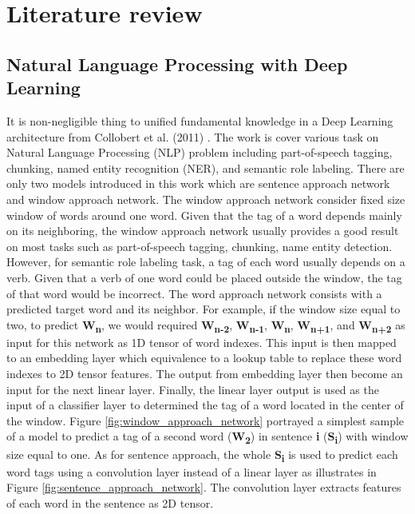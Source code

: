 \chapter{Literature review}

\section{Natural Language Processing with Deep Learning}
It is non-negligible thing to unified fundamental knowledge in a Deep Learning architecture from Collobert et al. (2011) \cite{DBLP:journals/corr/abs-1103-0398}.
The work is cover various task on Natural Language Processing (NLP) problem including part-of-speech tagging, chunking, named entity recognition (NER), and semantic role labeling.
There are only two models introduced in this work which are sentence approach network and window approach network.
The window approach network consider fixed size window of words around one word.
Given that the tag of a word depends mainly on its neighboring, the window approach network usually provides a good result on most tasks such as part-of-speech tagging, chunking, name entity detection.
However, for semantic role labeling task, a tag of each word usually depends on a verb.
Given that a verb of one word could be placed outside the window, the tag of that word would be incorrect.
The word approach network consists with a predicted target word and its neighbor.
For example, if the window size equal to two, to predict \textbf{W\textsubscript{n}}, we would required \textbf{W\textsubscript{n-2}}, \textbf{W\textsubscript{n-1}}, \textbf{W\textsubscript{n}}, \textbf{W\textsubscript{n+1}}, and \textbf{W\textsubscript{n+2}} as input for this network as 1D tensor of word indexes.
This input is then mapped to an embedding layer which equivalence to a lookup table to replace these word indexes to 2D tensor features.
The output from embedding layer then become an input for the next linear layer.
Finally, the linear layer output is used as the input of a classifier layer to determined the tag of a word located in the center of the window.
Figure \ref{fig:window_approach_network} portrayed a simplest sample of a model to predict a tag of a second word (\textbf{W\textsubscript{2}}) in sentence \textbf{i} (\textbf{S\textsubscript{i}}) with window size equal to one.
As for sentence approach, the whole \textbf{S\textsubscript{i}} is used to predict each word tags using a convolution layer instead of a linear layer as illustrates in Figure \ref{fig:sentence_approach_network}. The convolution layer extracts features of each word in the sentence as 2D tensor. 
